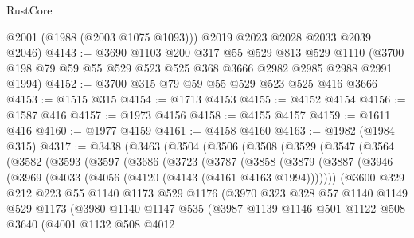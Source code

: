 \begin{lexlean}{RustCore}
\begin{coremodule}
        @2001
        (@1988 (@2003 @1075 @1093)))
      @2019
      @2023
      @2028
      @2033
      @2039
      @2046)
@4143 := @3690
    @1103
    @200
    @317
    @55
    @529
    @813
    @529
    @1110
    (@3700 @198 @79 @59 @55 @529 @523 @525 @368 @3666 @2982 @2985 @2988 @2991 @1994)
@4152 := @3700 @315 @79 @59 @55 @529 @523 @525 @416 @3666
@4153 := @1515 @315
@4154 := @1713 @4153
@4155 := @4152 @4154
@4156 := @1587 @416
@4157 := @1973 @4156
@4158 := @4155 @4157
@4159 := @1611 @416
@4160 := @1977 @4159
@4161 := @4158 @4160
@4163 := @1982 (@1984 @315)
@4317 := @3438
    (@3463
      (@3504
        (@3506
          (@3508
            (@3529
              (@3547
                (@3564
                  (@3582
                    (@3593
                      (@3597
                        (@3686
                          (@3723
                            (@3787
                              (@3858
                                (@3879
                                  (@3887
                                    (@3946
                                      (@3969 (@4033 (@4056 (@4120 (@4143 (@4161 @4163 @1994)))))))
                                    (@3600
                                      @329
                                      @212
                                      @223
                                      @55
                                      @1140
                                      @1173
                                      @529
                                      @1176
                                      (@3970
                                        @323
                                        @328
                                        @57
                                        @1140
                                        @1149
                                        @529
                                        @1173
                                        (@3980
                                          @1140
                                          @1147
                                          @535
                                          (@3987
                                            @1139
                                            @1146
                                            @501
                                            @1122
                                            @508
                                            @3640
                                            (@4001
                                              @1132
                                              @508
                                              @4012

\end{coremodule}
\end{lexlean}
